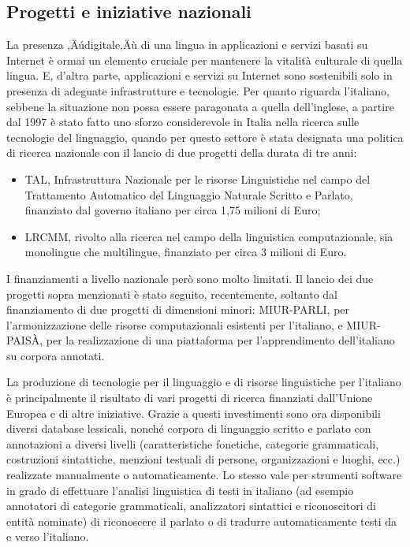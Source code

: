 \begin{multicols}{2}
\subsection{Progetti e iniziative nazionali}

La presenza ‚Äúdigitale‚Äù di una lingua in applicazioni e servizi basati su Internet \`{e} ormai un elemento cruciale per mantenere la vitalit\`{a} culturale di quella lingua. E, d'altra parte, applicazioni e servizi su Internet sono sostenibili solo in presenza di adeguate infrastrutture e tecnologie. Per quanto riguarda l'italiano, sebbene la situazione non possa essere paragonata a quella dell'inglese, a partire dal 1997 \`{e} stato fatto uno sforzo considerevole in Italia nella ricerca sulle tecnologie del linguaggio, quando per questo settore \`{e} stata designata una politica di ricerca nazionale con il lancio di due progetti della durata di tre anni:

\begin{itemize}
\item TAL, Infrastruttura Nazionale per le risorse Linguistiche nel campo del Trattamento Automatico del Linguaggio Naturale Scritto e Parlato, finanziato dal governo italiano per circa 1,75 milioni di Euro;
\item LRCMM, rivolto alla ricerca nel campo della linguistica computazionale, sia monolingue che multilingue, finanziato per circa 3 milioni di Euro.
\end{itemize}

I finanziamenti a livello nazionale per\`{o} sono molto limitati. Il lancio dei due progetti sopra menzionati \`{e} stato seguito, recentemente, soltanto dal finanziamento di due progetti di dimensioni minori: MIUR-PARLI, per l'armonizzazione delle risorse computazionali esistenti per l'italiano, e MIUR-PAIS\`{A}, per la realizzazione di una piattaforma per l'apprendimento dell'italiano su corpora annotati.

La produzione di tecnologie per il linguaggio e di risorse linguistiche per l'italiano \`{e} principalmente il risultato di vari progetti di ricerca finanziati dall'Unione Europea e di altre iniziative. Grazie a questi investimenti sono ora disponibili diversi database lessicali, nonch\'{e} corpora di linguaggio scritto e parlato con annotazioni a diversi livelli (caratteristiche fonetiche, categorie grammaticali, costruzioni sintattiche, menzioni testuali di persone, organizzazioni e luoghi, ecc.) realizzate manualmente o automaticamente. Lo stesso vale per strumenti software in grado di effettuare l'analisi linguistica di testi in italiano (ad esempio annotatori di categorie grammaticali, analizzatori sintattici e riconoscitori di entit\`{a} nominate) di riconoscere il parlato o di tradurre automaticamente testi da e verso l'italiano.


\end{multicols}
